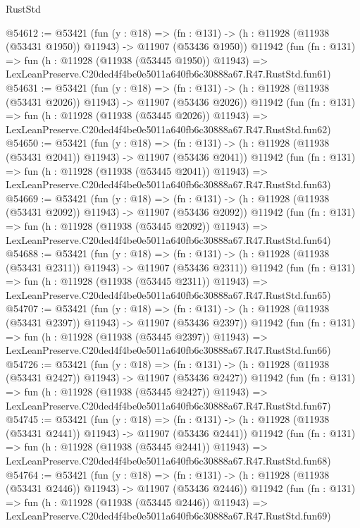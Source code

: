 \begin{lexlean}{RustStd}
\begin{coremodule}
@54612 := @53421
    (fun (y : @18) =>
    (fn : @131) -> (h : @11928 (@11938 (@53431 @1950)) @11943) -> @11907 (@53436 @1950))
    @11942
    (fun (fn : @131) =>
    fun (h : @11928 (@11938 (@53445 @1950)) @11943) =>
    LexLeanPreserve.C20ded4f4be0e5011a640fb6c30888a67.R47.RustStd.fun61)
@54631 := @53421
    (fun (y : @18) =>
    (fn : @131) -> (h : @11928 (@11938 (@53431 @2026)) @11943) -> @11907 (@53436 @2026))
    @11942
    (fun (fn : @131) =>
    fun (h : @11928 (@11938 (@53445 @2026)) @11943) =>
    LexLeanPreserve.C20ded4f4be0e5011a640fb6c30888a67.R47.RustStd.fun62)
@54650 := @53421
    (fun (y : @18) =>
    (fn : @131) -> (h : @11928 (@11938 (@53431 @2041)) @11943) -> @11907 (@53436 @2041))
    @11942
    (fun (fn : @131) =>
    fun (h : @11928 (@11938 (@53445 @2041)) @11943) =>
    LexLeanPreserve.C20ded4f4be0e5011a640fb6c30888a67.R47.RustStd.fun63)
@54669 := @53421
    (fun (y : @18) =>
    (fn : @131) -> (h : @11928 (@11938 (@53431 @2092)) @11943) -> @11907 (@53436 @2092))
    @11942
    (fun (fn : @131) =>
    fun (h : @11928 (@11938 (@53445 @2092)) @11943) =>
    LexLeanPreserve.C20ded4f4be0e5011a640fb6c30888a67.R47.RustStd.fun64)
@54688 := @53421
    (fun (y : @18) =>
    (fn : @131) -> (h : @11928 (@11938 (@53431 @2311)) @11943) -> @11907 (@53436 @2311))
    @11942
    (fun (fn : @131) =>
    fun (h : @11928 (@11938 (@53445 @2311)) @11943) =>
    LexLeanPreserve.C20ded4f4be0e5011a640fb6c30888a67.R47.RustStd.fun65)
@54707 := @53421
    (fun (y : @18) =>
    (fn : @131) -> (h : @11928 (@11938 (@53431 @2397)) @11943) -> @11907 (@53436 @2397))
    @11942
    (fun (fn : @131) =>
    fun (h : @11928 (@11938 (@53445 @2397)) @11943) =>
    LexLeanPreserve.C20ded4f4be0e5011a640fb6c30888a67.R47.RustStd.fun66)
@54726 := @53421
    (fun (y : @18) =>
    (fn : @131) -> (h : @11928 (@11938 (@53431 @2427)) @11943) -> @11907 (@53436 @2427))
    @11942
    (fun (fn : @131) =>
    fun (h : @11928 (@11938 (@53445 @2427)) @11943) =>
    LexLeanPreserve.C20ded4f4be0e5011a640fb6c30888a67.R47.RustStd.fun67)
@54745 := @53421
    (fun (y : @18) =>
    (fn : @131) -> (h : @11928 (@11938 (@53431 @2441)) @11943) -> @11907 (@53436 @2441))
    @11942
    (fun (fn : @131) =>
    fun (h : @11928 (@11938 (@53445 @2441)) @11943) =>
    LexLeanPreserve.C20ded4f4be0e5011a640fb6c30888a67.R47.RustStd.fun68)
@54764 := @53421
    (fun (y : @18) =>
    (fn : @131) -> (h : @11928 (@11938 (@53431 @2446)) @11943) -> @11907 (@53436 @2446))
    @11942
    (fun (fn : @131) =>
    fun (h : @11928 (@11938 (@53445 @2446)) @11943) =>
    LexLeanPreserve.C20ded4f4be0e5011a640fb6c30888a67.R47.RustStd.fun69)

\end{coremodule}
\end{lexlean}
